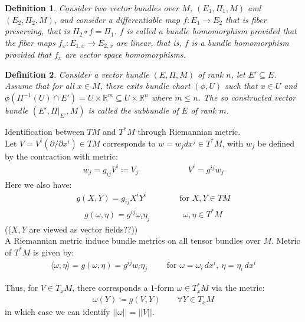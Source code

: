 \documentclass[11pt]{book}
\theoremstyle{break}
\theoremstyle{break}
\newtheorem{defn}{Definition}[corL]
\newcommand{\R}{\mathbb{R}}
\newcommand{\pd}{\partial}
\begin{document}
\begin{defn}
Consider two vector bundles over $M$, $(E_1,\Pi_1,M)$ and $(E_2, \Pi_2,M)$, and consider a differentiable map $f:E_1 \to E_2$ that is fiber preserving, that is $\Pi_2 \circ f = \Pi_1$. $f$ is called a bundle homomorphism provided that the fiber maps $f_x:E_{1,x} \to E_{2,x}$ are linear, that is, $f$ is a bundle homomorphism provided that $f_x$ are vector space homomorphisms.
\end{defn}

\begin{defn}
Consider a vector bundle $(E,\Pi,M)$ of rank $n$, let $E' \subseteq E$. Assume that for all $x \in M$, there exits bundle chart $(\phi,U)$ such that $x \in U$ and $\phi(\Pi^{-1}(U) \cap E') = U \times \R^m \subseteq U\times \R^n$ where $m \leq n$. The so constructed vector bundle $(E', \Pi|_{E'}, M)$ is called the subbundle of $E$ of rank $m$. 
\end{defn}

Identification between $TM$ and $T^*M$ through Riemannian metric.\\

Let $V = V^i (\pd/ \pd x^i) \in TM$ corresponds to $w = w_j dx^j \in T^*M$, with $w_j$ be defined by the contraction with metric:
\begin{align*}
w_j = g_{ij}V^i \coloneqq V_j \qquad\qquad\qquad V^i = g^{ij}w_j
\end{align*}
Here we also have:
\begin{align*}
g(X,Y) = g_{ij}X^iY^i\qquad\qquad \text{for }X,Y \in TM
\end{align*}
\begin{align*}
g(\omega, \eta) = g^{ij}\omega_i \eta_j \qquad\qquad \omega, \eta \in T^*M
\end{align*}
(($X,Y$ are viewed as vector fields??))\\

A Riemannian metric induce bundle metrics on all tensor bundles over $M$. Metric of $T^*M$ is given by:
\begin{align*}
\langle \omega, \eta\rangle = g(\omega, \eta) = g^{ij}w_i\eta_j \qquad \text{ for }\omega = \omega_i\, dx^i, \ \eta = \eta_i\, dx^i
\end{align*}

Thus, for $V \in T_xM$, there corresponds a $1$-form $\omega \in T^*_xM$ via the metric:
\begin{align*}
\omega(Y) \coloneqq g(V,Y)\qquad \forall Y \in T_xM
\end{align*}
in which case we can identify $||\omega|| = ||V||$.\\
\end{document}
